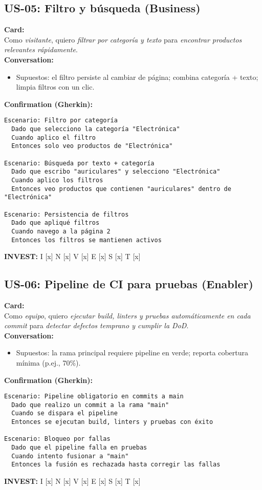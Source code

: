 \documentclass[11pt]{article}
\begin{document}
\subsection*{US-05: Filtro y búsqueda (Business)}
\begin{tcolorbox}
\textbf{Card:}\\
Como \emph{visitante}, quiero \emph{filtrar por categoría y texto} para \emph{encontrar productos relevantes rápidamente}.\\[3pt]
\textbf{Conversation:}
\begin{itemize}[leftmargin=1.2em]
  \item Supuestos: el filtro persiste al cambiar de página; combina categoría + texto; limpia filtros con un clic.
\end{itemize}
\textbf{Confirmation (Gherkin):}
\begin{verbatim}
Escenario: Filtro por categoría
  Dado que selecciono la categoría "Electrónica"
  Cuando aplico el filtro
  Entonces solo veo productos de "Electrónica"

Escenario: Búsqueda por texto + categoría
  Dado que escribo "auriculares" y selecciono "Electrónica"
  Cuando aplico los filtros
  Entonces veo productos que contienen "auriculares" dentro de "Electrónica"

Escenario: Persistencia de filtros
  Dado que apliqué filtros
  Cuando navego a la página 2
  Entonces los filtros se mantienen activos
\end{verbatim}
\textbf{INVEST:} I [x] N [x] V [x] E [x] S [x] T [x]
\end{tcolorbox}

\subsection*{US-06: Pipeline de CI para pruebas (Enabler)}
\begin{tcolorbox}
\textbf{Card:}\\
Como \emph{equipo}, quiero \emph{ejecutar build, linters y pruebas automáticamente en cada commit} para \emph{detectar defectos temprano y cumplir la DoD}.\\[3pt]
\textbf{Conversation:}
\begin{itemize}[leftmargin=1.2em]
  \item Supuestos: la rama principal requiere pipeline en verde; reporta cobertura mínima (p.ej., 70\%).
\end{itemize}
\textbf{Confirmation (Gherkin):}
\begin{verbatim}
Escenario: Pipeline obligatorio en commits a main
  Dado que realizo un commit a la rama "main"
  Cuando se dispara el pipeline
  Entonces se ejecutan build, linters y pruebas con éxito

Escenario: Bloqueo por fallas
  Dado que el pipeline falla en pruebas
  Cuando intento fusionar a "main"
  Entonces la fusión es rechazada hasta corregir las fallas
\end{verbatim}
\textbf{INVEST:} I [x] N [x] V [x] E [x] S [x] T [x]
\end{tcolorbox}
\end{document}
